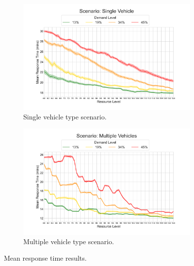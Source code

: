 \documentclass[preprint,12pt]{elsarticle}
\begin{document}
\begin{figure} \begin{center} \begin{subfigure}{0.48\textwidth}
\includegraphics[width=\textwidth]{img/results/single_MeanResponseTime}
\caption{Single vehicle type scenario.} \label{fig:results_response_single}
\end{subfigure} \begin{subfigure}{0.48\textwidth}
\includegraphics[width=\textwidth]{img/results/multiple_MeanResponseTime}
\caption{Multiple vehicle type scenario.} \label{fig:results_response_multiple}
\end{subfigure} \end{center} \caption{Mean response time results.} \end{figure}
\end{document}
